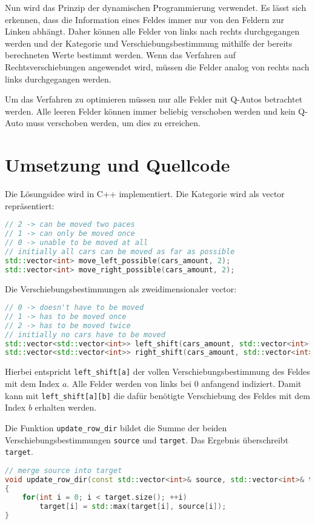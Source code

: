 \documentclass[a4paper,10pt,ngerman]{scrartcl}
\begin{document}
Nun wird das Prinzip der dynamischen Programmierung verwendet.
Es lässt sich erkennen, dass die Information eines Feldes immer nur von den Feldern zur Linken abhängt.
Daher können alle Felder von links nach rechts durchgegangen werden und der Kategorie und Verschiebungsbestimmung mithilfe der bereits berechneten Werte bestimmt werden.
Wenn das Verfahren auf Rechtsverschiebungen angewendet wird, müssen die Felder analog von rechts nach links durchgegangen werden.

Um das Verfahren zu optimieren müssen nur alle Felder mit Q-Autos betrachtet werden.
Alle leeren Felder können immer beliebig verschoben werden und kein Q-Auto muss verschoben werden, um dies zu erreichen.

\section{Umsetzung und Quellcode}
Die Lösungsidee wird in C++ implementiert.
Die Kategorie wird als vector repräsentiert:
\begin{lstlisting}[language=C++]
// 2 -> can be moved two paces
// 1 -> can only be moved once
// 0 -> unable to be moved at all
// initially all cars can be moved as far as possible
std::vector<int> move_left_possible(cars_amount, 2);
std::vector<int> move_right_possible(cars_amount, 2);
\end{lstlisting}
Die Verschiebungsbestimmungen als zweidimensionaler vector:
\begin{lstlisting}[language=C++]
// 0 -> doesn't have to be moved
// 1 -> has to be moved once
// 2 -> has to be moved twice
// initially no cars have to be moved
std::vector<std::vector<int>> left_shift(cars_amount, std::vector<int>(cars_amount, 0));
std::vector<std::vector<int>> right_shift(cars_amount, std::vector<int>(cars_amount, 0));
\end{lstlisting}
Hierbei entspricht \lstinline{left_shift[a]} der vollen Verschiebungsbestimmung des Feldes mit dem Index $a$.
Alle Felder werden von links bei $0$ anfangend indiziert.
Damit kann mit \lstinline{left_shift[a][b]} die dafür benötigte Verschiebung des Feldes mit dem Index $b$ erhalten werden.

Die Funktion \lstinline{update_row_dir} bildet die Summe der beiden Verschiebungsbestimmungen \lstinline{source} und \lstinline{target}.
Das Ergebnis überschreibt \lstinline{target}.
\begin{lstlisting}[language=C++]
// merge source into target
void update_row_dir(const std::vector<int>& source, std::vector<int>& target)
{
    for(int i = 0; i < target.size(); ++i)
        target[i] = std::max(target[i], source[i]);
}
\end{lstlisting}
\end{document}
